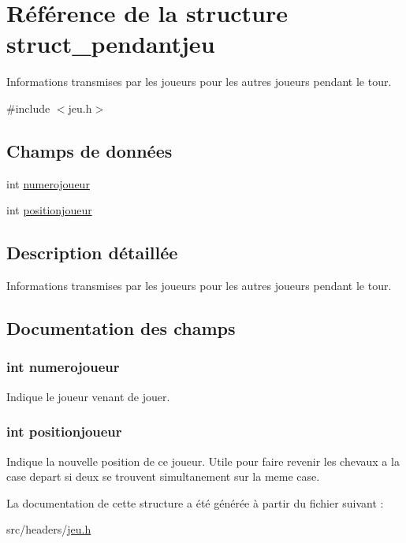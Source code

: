 \hypertarget{structstruct__pendantjeu}{\section{Référence de la structure struct\-\_\-pendantjeu}
\label{structstruct__pendantjeu}
}


Informations transmises par les joueurs pour les autres joueurs pendant le tour.  




{\ttfamily \#include $<$jeu.\-h$>$}

\subsection*{Champs de données}
\begin{DoxyCompactItemize}
\item 
int \hyperlink{structstruct__pendantjeu_a3e4028dc4a9077afc6e53e423343bd70}{numerojoueur}
\item 
int \hyperlink{structstruct__pendantjeu_a886601c5a72273d41b31c90740071a61}{positionjoueur}
\end{DoxyCompactItemize}


\subsection{Description détaillée}
Informations transmises par les joueurs pour les autres joueurs pendant le tour. 

\subsection{Documentation des champs}
\hypertarget{structstruct__pendantjeu_a3e4028dc4a9077afc6e53e423343bd70}{
\subsubsection[{numerojoueur}]{\setlength{\rightskip}{0pt plus 5cm}int numerojoueur}}\label{structstruct__pendantjeu_a3e4028dc4a9077afc6e53e423343bd70}
Indique le joueur venant de jouer. \hypertarget{structstruct__pendantjeu_a886601c5a72273d41b31c90740071a61}{
\subsubsection[{positionjoueur}]{\setlength{\rightskip}{0pt plus 5cm}int positionjoueur}}\label{structstruct__pendantjeu_a886601c5a72273d41b31c90740071a61}
Indique la nouvelle position de ce joueur. Utile pour faire revenir les chevaux a la case depart si deux se trouvent simultanement sur la meme case. 

La documentation de cette structure a été générée à partir du fichier suivant \-:\begin{DoxyCompactItemize}
\item 
src/headers/\hyperlink{jeu_8h}{jeu.\-h}\end{DoxyCompactItemize}
